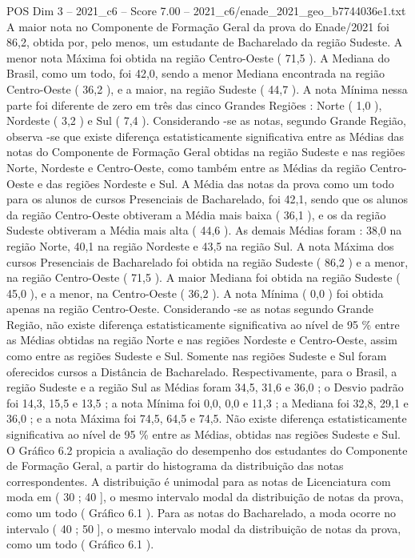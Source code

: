 \begin{textsample}{POS Dim 3 – 2021\_c6 – Score 7.00 – 2021\_c6/enade\_2021\_geo\_b7744036e1.txt}
A maior nota no Componente de Formação Geral da prova do Enade/2021 foi 86,2, obtida por, pelo menos, um estudante de Bacharelado da região Sudeste.
A menor nota Máxima foi obtida na região Centro-Oeste ( 71,5 ).
A Mediana do Brasil, como um todo, foi 42,0, sendo a menor Mediana encontrada na região Centro-Oeste ( 36,2 ), e a maior, na região Sudeste ( 44,7 ).
A nota Mínima nessa parte foi diferente de zero em três das cinco Grandes Regiões : Norte ( 1,0 ), Nordeste ( 3,2 ) e Sul ( 7,4 ).
Considerando -se as notas, segundo Grande Região, observa -se que existe diferença estatisticamente significativa entre as Médias das notas do Componente de Formação Geral obtidas na região Sudeste e nas regiões Norte, Nordeste e Centro-Oeste, como também entre as Médias da região Centro-Oeste e das regiões Nordeste e Sul.
A Média das notas da prova como um todo para os alunos de cursos Presenciais de Bacharelado, foi 42,1, sendo que os alunos da região Centro-Oeste obtiveram a Média mais baixa ( 36,1 ), e os da região Sudeste obtiveram a Média mais alta ( 44,6 ).
As demais Médias foram : 38,0 na região Norte, 40,1 na região Nordeste e 43,5 na região Sul.
A nota Máxima dos cursos Presenciais de Bacharelado foi obtida na região Sudeste ( 86,2 ) e a menor, na região Centro-Oeste ( 71,5 ).
A maior Mediana foi obtida na região Sudeste ( 45,0 ), e a menor, na Centro-Oeste ( 36,2 ).
A nota Mínima ( 0,0 ) foi obtida apenas na região Centro-Oeste.
Considerando -se as notas segundo Grande Região, não existe diferença estatisticamente significativa ao nível de 95 \% entre as Médias obtidas na região Norte e nas regiões Nordeste e Centro-Oeste, assim como entre as regiões Sudeste e Sul.
Somente nas regiões Sudeste e Sul foram oferecidos cursos a Distância de Bacharelado.
Respectivamente, para o Brasil, a região Sudeste e a região Sul as Médias foram 34,5, 31,6 e 36,0 ; o Desvio padrão foi 14,3, 15,5 e 13,5 ; a nota Mínima foi 0,0, 0,0 e 11,3 ; a Mediana foi 32,8, 29,1 e 36,0 ; e a nota Máxima foi 74,5, 64,5 e 74,5.
Não existe diferença estatisticamente significativa ao nível de 95 \% entre as Médias, obtidas nas regiões Sudeste e Sul.
O Gráfico 6.2 propicia a avaliação do desempenho dos estudantes do Componente de Formação Geral, a partir do histograma da distribuição das notas correspondentes.
A distribuição é unimodal para as notas de Licenciatura com moda em ( 30 ; 40 ], o mesmo intervalo modal da distribuição de notas da prova, como um todo ( Gráfico 6.1 ).
Para as notas do Bacharelado, a moda ocorre no intervalo ( 40 ; 50 ], o mesmo intervalo modal da distribuição de notas da prova, como um todo ( Gráfico 6.1 ).

\end{textsample}
